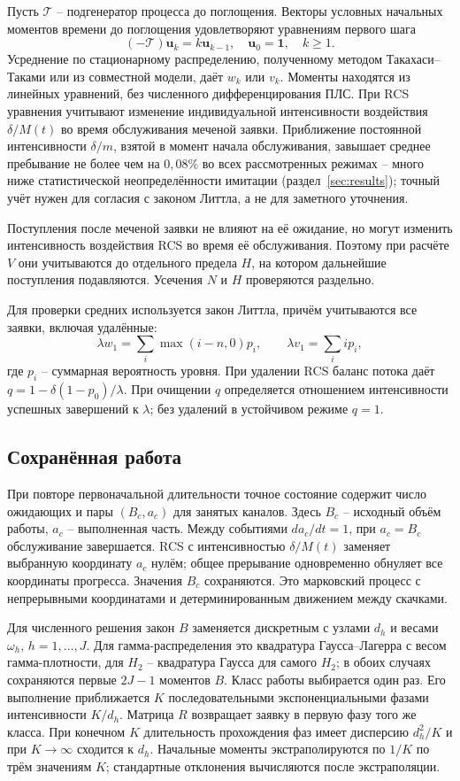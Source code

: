\documentclass[a4paper,12pt]{article}
\begin{document}
Пусть \(\mathcal T\) -- подгенератор процесса до поглощения. Векторы условных начальных моментов времени до поглощения удовлетворяют уравнениям первого шага
\[
(-\mathcal T)\boldsymbol u_k=k\boldsymbol u_{k-1},\quad
\boldsymbol u_0=\mathbf1,\quad k\ge1.
\]
Усреднение по стационарному распределению, полученному методом Такахаси--Таками или из совместной модели, даёт \(w_k\) или \(v_k\). Моменты находятся из линейных уравнений, без численного дифференцирования ПЛС. При RCS уравнения учитывают изменение индивидуальной интенсивности воздействия \(\delta/M(t)\) во время обслуживания меченой заявки. Приближение постоянной интенсивности \(\delta/m\), взятой в момент начала обслуживания, завышает среднее пребывание не более чем на \(0{,}08\%\) во всех рассмотренных режимах -- много ниже статистической неопределённости имитации (раздел~\ref{sec:results}); точный учёт нужен для согласия с законом Литтла, а не для заметного уточнения.

Поступления после меченой заявки не влияют на её ожидание, но могут изменить интенсивность воздействия RCS во время её обслуживания. Поэтому при расчёте \(V\) они учитываются до отдельного предела \(H\), на котором дальнейшие поступления подавляются. Усечения \(N\) и \(H\) проверяются раздельно.

Для проверки средних используется закон Литтла, причём учитываются все заявки, включая удалённые:
\[
\lambda w_1=\sum_i\max(i-n,0)p_i,\qquad
\lambda v_1=\sum_i i p_i,
\]
где \(p_i\) -- суммарная вероятность уровня. При удалении RCS баланс потока даёт \(q=1-\delta(1-p_0)/\lambda\). При очищении \(q\) определяется отношением интенсивности успешных завершений к \(\lambda\); без удалений в устойчивом режиме \(q=1\).

\subsection{Сохранённая работа}
При повторе первоначальной длительности точное состояние содержит число ожидающих и пары \((B_c,a_c)\) для занятых каналов. Здесь \(B_c\) -- исходный объём работы, \(a_c\) -- выполненная часть. Между событиями \(da_c/dt=1\), при \(a_c=B_c\) обслуживание завершается. RCS с интенсивностью \(\delta/M(t)\) заменяет выбранную координату \(a_c\) нулём; общее прерывание одновременно обнуляет все координаты прогресса. Значения \(B_c\) сохраняются. Это марковский процесс с непрерывными координатами и детерминированным движением между скачками.

Для численного решения закон \(B\) заменяется дискретным с узлами \(d_h\) и весами \(\omega_h\), \(h=1,\ldots,J\). Для гамма-распределения это квадратура Гаусса--Лагерра с весом гамма-плотности, для \(H_2\) -- квадратура Гаусса для самого \(H_2\); в обоих случаях сохраняются первые \(2J-1\) моментов \(B\). Класс работы выбирается один раз. Его выполнение приближается \(K\) последовательными экспоненциальными фазами интенсивности \(K/d_h\). Матрица \(R\) возвращает заявку в первую фазу того же класса. При конечном \(K\) длительность прохождения фаз имеет дисперсию \(d_h^2/K\) и при \(K\to\infty\) сходится к \(d_h\). Начальные моменты экстраполируются по \(1/K\) по трём значениям \(K\); стандартные отклонения вычисляются после экстраполяции.
\end{document}
